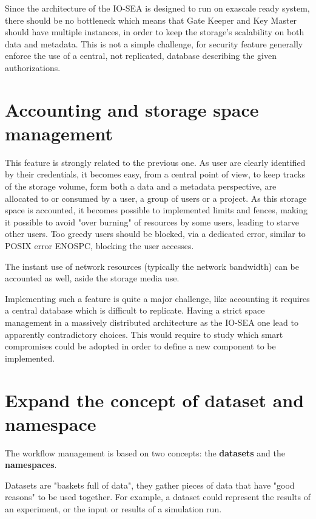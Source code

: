 Since the architecture of the IO-SEA is designed to run on exascale ready system, there should be no bottleneck
which means that Gate Keeper and Key Master should have multiple instances, in order to keep the storage's
scalability on both data and metadata. This is not a simple challenge, for security feature generally enforce the
use of a central, not replicated, database describing the given authorizations. 

\section{Accounting and storage space management}

This feature is strongly related to the previous one. As user are clearly identified by their credentials, it
becomes easy, from a central point of view, to keep tracks of the storage volume, form both a data and a metadata
perspective, are allocated to or consumed by a user, a group of users or a project. As this storage space is 
accounted, it becomes possible to implemented limits and fences, making it possible to avoid "over burning" of
resources by some users, leading to starve other users. Too greedy users should be blocked, via a dedicated 
error, similar to POSIX error ENOSPC, blocking the user accesses. 

The instant use of network resources (typically the network bandwidth) can be accounted as well, aside the 
storage media use. 

Implementing such a feature is quite a major challenge, like accounting it requires a central database which
is difficult to replicate. Having a strict space management in a massively distributed architecture as the
IO-SEA one lead to apparently contradictory choices. This would require to study which smart compromises could
be adopted in order to define a new component to be implemented. 

\section{Expand the concept of dataset and namespace}

The workflow management is based on two concepts: the \textbf{datasets} and the \textbf{namespaces}. 

Datasets are "baskets full of data", they gather pieces of data that have "good reasons" to be used together. For
example, a dataset could represent the results of an experiment, or the input or results of a simulation run. 

